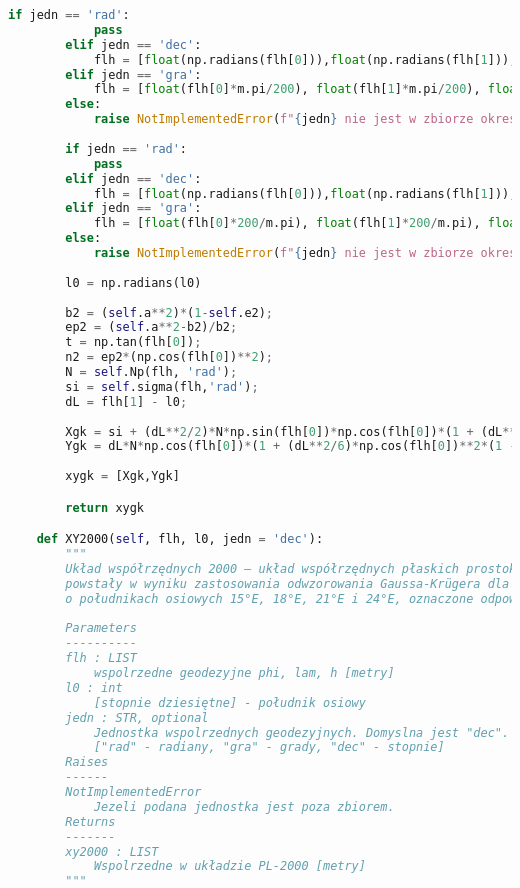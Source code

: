 \begin{lstlisting}[caption={\emph{Treść programu}}, language=Python]
        if jedn == 'rad':
            pass
        elif jedn == 'dec':
            flh = [float(np.radians(flh[0])),float(np.radians(flh[1])),float(flh[2])]
        elif jedn == 'gra':
            flh = [float(flh[0]*m.pi/200), float(flh[1]*m.pi/200), float(flh[2])]
        else:
            raise NotImplementedError(f"{jedn} nie jest w zbiorze okreslen")
        
        if jedn == 'rad':
            pass
        elif jedn == 'dec':
            flh = [float(np.radians(flh[0])),float(np.radians(flh[1])),float(flh[2])]
        elif jedn == 'gra':
            flh = [float(flh[0]*200/m.pi), float(flh[1]*200/m.pi), float(flh[2])]
        else:
            raise NotImplementedError(f"{jedn} nie jest w zbiorze okreslen")
       
        l0 = np.radians(l0)
       
        b2 = (self.a**2)*(1-self.e2);
        ep2 = (self.a**2-b2)/b2;
        t = np.tan(flh[0]);
        n2 = ep2*(np.cos(flh[0])**2);
        N = self.Np(flh, 'rad');
        si = self.sigma(flh,'rad');
        dL = flh[1] - l0;
       
        Xgk = si + (dL**2/2)*N*np.sin(flh[0])*np.cos(flh[0])*(1 + (dL**2/12)*np.cos(flh[0])**2*(5 - t**2 + 9*n2 + 4*n2**2) + (dL**4/360)*np.cos(flh[0])**4*(61 - 58*t**2 + t**4 + 14*n2 - 58*n2*t**2));
        Ygk = dL*N*np.cos(flh[0])*(1 + (dL**2/6)*np.cos(flh[0])**2*(1 - t**2 + n2) + (dL**4/120)*np.cos(flh[0])**4*(5 - 18*t**2 + t**4 + 14*n2 - 58*n2*t**2));
       
        xygk = [Xgk,Ygk]

        return xygk

    def XY2000(self, flh, l0, jedn = 'dec'):
        """
        Układ współrzędnych 2000 – układ współrzędnych płaskich prostokątnych zwany układem „2000”, 
        powstały w wyniku zastosowania odwzorowania Gaussa-Krügera dla elipsoidy GRS 80 w czterech trzystopniowych strefach 
        o południkach osiowych 15°E, 18°E, 21°E i 24°E, oznaczone odpowiednio numerami – 5, 6, 7 i 8.
       
        Parameters
        ----------
        flh : LIST
            wspolrzedne geodezyjne phi, lam, h [metry]
        l0 : int
            [stopnie dziesiętne] - południk osiowy
        jedn : STR, optional
            Jednostka wspolrzednych geodezyjnych. Domyslna jest "dec".
            ["rad" - radiany, "gra" - grady, "dec" - stopnie]
        Raises
        ------
        NotImplementedError
            Jezeli podana jednostka jest poza zbiorem.
        Returns
        -------
        xy2000 : LIST
            Wspolrzedne w układzie PL-2000 [metry]
        """
        

\end{lstlisting}
